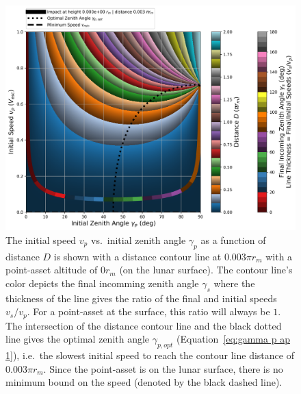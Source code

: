 \documentclass{article}
\begin{document}
\begin{figure}[!htb]
	\centering
	\includegraphics[width=1.00\linewidth]{dist_speed_zenith_plot_000_0.000e+00_0.010.png}
	\caption{The initial speed $v_p$ vs.\ initial zenith angle $\gamma_p$ as a function of distance $D$ is shown with a distance contour line at $0.003\pi r_m$ with a point-asset altitude of $0 r_m$ (on the lunar surface). The contour line's color depicts the final incomming zenith angle $\gamma_s$ where the thickness of the line gives the ratio of the final and initial speeds $v_s/v_p$. For a point-asset at the surface, this ratio will always be $1$. The intersection of the distance contour line and the black dotted line gives the optimal zenith angle $\gamma_{p,opt}$ (Equation~\eqref{eq:gamma p ap 1}), i.e.\ the slowest initial speed to reach the contour line distance of $0.003\pi r_m$. Since the point-asset is on the lunar surface, there is no minimum bound on the speed (denoted by the black dashed line).
	}\label{fig:dist_speed_zenith_plot_000_0.000e+00_0.010}
\end{figure}
\end{document}

